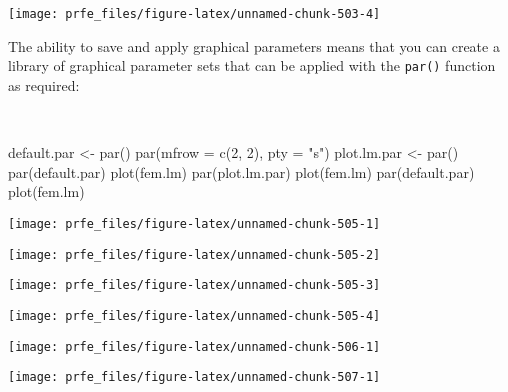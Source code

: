 \documentclass[
  12pt,
  a4paper]{book}
\newenvironment{Shaded}{\begin{snugshade}}{\end{snugshade}}
\newcommand{\AttributeTok}[1]{\textcolor[rgb]{0.77,0.63,0.00}{#1}}
\newcommand{\DecValTok}[1]{\textcolor[rgb]{0.00,0.00,0.81}{#1}}
\newcommand{\FunctionTok}[1]{\textcolor[rgb]{0.00,0.00,0.00}{#1}}
\newcommand{\NormalTok}[1]{#1}
\newcommand{\OtherTok}[1]{\textcolor[rgb]{0.56,0.35,0.01}{#1}}
\newcommand{\StringTok}[1]{\textcolor[rgb]{0.31,0.60,0.02}{#1}}
\begin{document}
\begin{center}\texttt{[image: prfe\_files/figure-latex/unnamed-chunk-503-4]} \end{center}

\newpage

The ability to save and apply graphical parameters means that you can create a library of graphical parameter sets that can be applied with the \texttt{par()} function as required:

~

\begin{Shaded}
\begin{Highlighting}[]
\NormalTok{default.par }\OtherTok{\textless{}{-}} \FunctionTok{par}\NormalTok{()}
\FunctionTok{par}\NormalTok{(}\AttributeTok{mfrow =} \FunctionTok{c}\NormalTok{(}\DecValTok{2}\NormalTok{, }\DecValTok{2}\NormalTok{), }\AttributeTok{pty =} \StringTok{"s"}\NormalTok{)}
\NormalTok{plot.lm.par }\OtherTok{\textless{}{-}} \FunctionTok{par}\NormalTok{()}
\FunctionTok{par}\NormalTok{(default.par)}
\FunctionTok{plot}\NormalTok{(fem.lm)}
\FunctionTok{par}\NormalTok{(plot.lm.par)}
\FunctionTok{plot}\NormalTok{(fem.lm)}
\FunctionTok{par}\NormalTok{(default.par)}
\FunctionTok{plot}\NormalTok{(fem.lm)}
\end{Highlighting}
\end{Shaded}

\newpage

\begin{center}\texttt{[image: prfe\_files/figure-latex/unnamed-chunk-505-1]} \end{center}

\begin{center}\texttt{[image: prfe\_files/figure-latex/unnamed-chunk-505-2]} \end{center}

\begin{center}\texttt{[image: prfe\_files/figure-latex/unnamed-chunk-505-3]} \end{center}

\begin{center}\texttt{[image: prfe\_files/figure-latex/unnamed-chunk-505-4]} \end{center}

\newpage

\begin{center}\texttt{[image: prfe\_files/figure-latex/unnamed-chunk-506-1]} \end{center}

\newpage

\begin{center}\texttt{[image: prfe\_files/figure-latex/unnamed-chunk-507-1]} \end{center}
\end{document}
